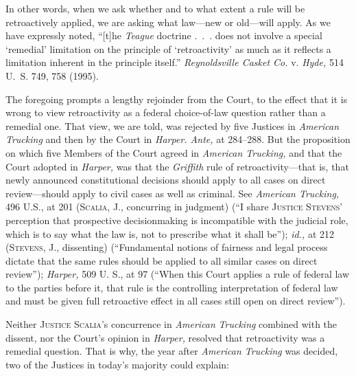 {  In other words, when we ask whether and to what extent a rule will be retroactively applied, we are asking what law---new or old---will apply. As we have expressly noted, ``[t]he \emph{Teague} doctrine .~.~. does not involve a special ‘remedial' limitation on the principle of ‘retroactivity' as much as it reflects a limitation inherent in the principle itself.'' \emph{Reynoldsville Casket Co.} v. \emph{Hyde,} 514 U.~S. 749, 758 (1995).

  The foregoing prompts a lengthy rejoinder from the Court, to the effect that it is wrong to view retroactivity as a federal choice-of-law question rather than a remedial one. \newpage  That view, we are told, was rejected by five Justices in \emph{American Trucking} and then by the Court in \emph{Harper. Ante,} at 284--288. But the proposition on which five Members of the Court agreed in \emph{American Trucking,} and that the Court adopted in \emph{Harper,} was that the \emph{Griffith} rule of retroactivity---that is, that newly announced constitutional decisions should apply to all cases on direct review---should apply to civil cases as well as criminal. See \emph{American Trucking,} 496 U.S., at 201 (\textsc{Scalia,} J., concurring in judgment) (``I share \textsc{Justice Stevens}' perception that prospective decisionmaking is incompatible with the judicial role, which is to say what the law is, not to prescribe what it shall be''); \emph{id.,} at 212 (\textsc{Stevens,} J., dissenting) (``Fundamental notions of fairness and legal process dictate that the same rules should be applied to all similar cases on direct review''); \emph{Harper,} 509 U. S., at 97 (``When this Court applies a rule of federal law to the parties before it, that rule is the controlling interpretation of federal law and must be given full retroactive effect in all cases still open on direct review'').

  Neither \textsc{Justice Scalia}'s concurrence in \emph{American} \emph{Trucking} combined with the dissent, nor the Court's opinion in \emph{Harper,} resolved that retroactivity was a remedial question. That is why, the year after \emph{American Trucking} was decided, two of the Justices in today's majority could explain:

    \begin{quote}


\end{quote}}
